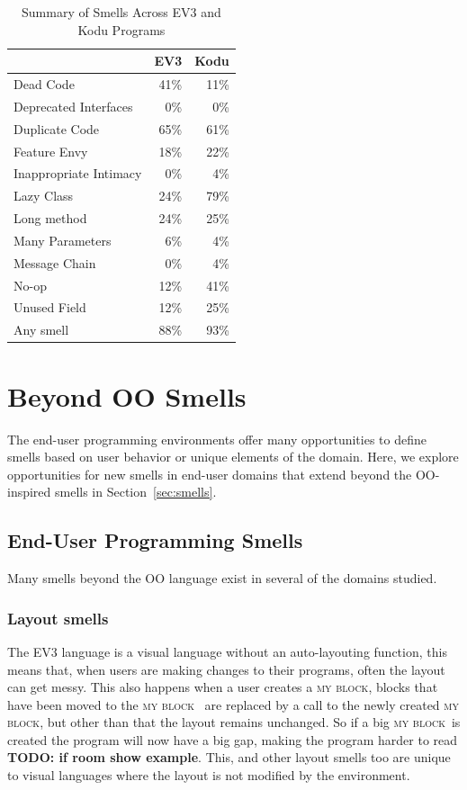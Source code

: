 \documentclass{sig-alternate}
\newcommand{\todo}[1]{\textbf{TODO: #1}}
\newcommand{\mb}{\textsc{my block}}
\begin{document}
\begin{table}
\caption{Summary of Smells Across EV3 and Kodu Programs \label{tab:smellsummary}}
\begin{center}
\begin{tabular}{l | r r}
&EV3&Kodu\\ \hline
Dead Code&41\%&11\%\\
Deprecated Interfaces & 0\% & 0\%\\
Duplicate Code&65\%&61\%\\
Feature Envy&18\%&22\%\\
Inappropriate Intimacy&0\%&4\%\\
Lazy Class&24\%&79\%\\
Long method&24\%&25\%\\
Many Parameters&6\%&4\%\\
Message Chain&0\%&4\%\\
No-op&12\%&41\%\\
Unused Field&12\%&25\%\\ \hline
Any smell & 88\% & 93\%
\end{tabular}
\end{center}
\end{table}

\section{Beyond OO Smells}
\label{sec:beyond}

\label{sec:smells:domain}
The end-user programming environments offer many opportunities to define smells based on user behavior or unique elements of the domain. Here, we explore opportunities for new smells in end-user domains that extend beyond the OO-inspired smells in Section~\ref{sec:smells}. 

\subsection{End-User Programming Smells}
Many smells beyond the OO language exist in several of the domains studied. 

\subsubsection{Layout smells}
The EV3 language is a visual language without an auto-layouting function, this means that, when users are making changes to their programs, often the layout can get messy. This also happens when a user creates a \mb, blocks that have been moved to the \mb~ are replaced by a call to the newly created \mb, but other than that the layout remains unchanged. So if a big \mb~is created the program will now have a big gap, making the program harder to read \todo{if room show example}. This, and other layout smells too are unique to visual languages where the layout is not modified by the environment.
\end{document}
